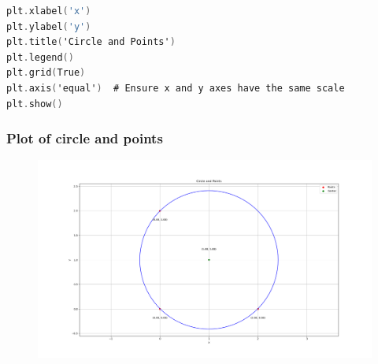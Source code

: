 \documentclass{beamer}
\theoremstyle{remark}
\numberwithin{equation}{section}
\begin{document}
\begin{frame}[fragile]
\begin{lstlisting}[language=C]
plt.xlabel('x')
plt.ylabel('y')
plt.title('Circle and Points')
plt.legend()
plt.grid(True)
plt.axis('equal')  # Ensure x and y axes have the same scale
plt.show()
\end{lstlisting}
\end{frame}
\begin{frame}
\frametitle{Plot of circle and points}
\begin{figure}
    \centering
    \includegraphics[width=0.7\linewidth]{./figs/Figure_1.png}
    \caption{}
    \label{fig:enter-label}
\end{figure}
\end{frame}
\end{document}
